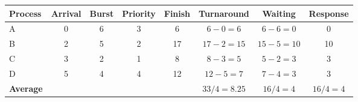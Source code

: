 \begin{tabular}{@{}lccccccc@{}}
\toprule
\textbf{Process} & \textbf{Arrival} & \textbf{Burst} & \textbf{Priority} & \textbf{Finish} & \textbf{Turnaround} & \textbf{Waiting} & \textbf{Response}\\
\midrule
A & 0 & 6 & 3 & 6 & $6-0=6$ & $6-6=0$ & 0\\
B & 2 & 5 & 2 & 17 & $17-2=15$ & $15-5=10$ & 10\\
C & 3 & 2 & 1 & 8 & $8-3=5$ & $5-2=3$ & 3\\
D & 5 & 4 & 4 & 12 & $12-5=7$ & $7-4=3$ & 3\\
\midrule
\textbf{Average} &  &  &  &  & $33/4=8.25$ & $16/4=4$ & $16/4=4$\\
\bottomrule
\end{tabular}
